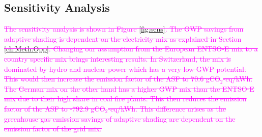 


 


\subsection{Sensitivity Analysis}

\textcolor{magenta}{\sout{The sensitivity analysis is shown in Figure \ref{fig:sens}. The GWP savings from adaptive shading is dependent on the electricity mix as explained in Section \ref{ch:Meth:Opp}. Changing our assumption from the European ENTSO-E mix to a country specific mix brings interesting results. In Switzerland, the mix is dominated by hydro and nuclear power which has a very low GWP potential\cite{itten2012life}. This would then increase the emission factor of the ASF to 70.6 gCO$_{2}$-eq/kWh. The German mix on the other hand has a higher GWP mix than the ENTSO-E mix due to their high share in coal fire plants. This then reduces the emission factor of the ASF to -792.9 gCO$_{2}$-eq/kWh. This difference arises as the greenhouse gas emission savings of adaptive shading are dependent on the emission factor of the grid mix.}}\\

